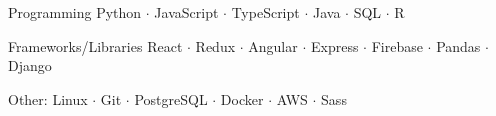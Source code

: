 

\begin{cvskills}

\cvskill
  {Programming} %
  {Python $\cdot$ JavaScript $\cdot$ TypeScript $\cdot$ Java $\cdot$ SQL $\cdot$ R } %

\cvskill
  {Frameworks/Libraries} %
  {React $\cdot$ Redux $\cdot$ Angular $\cdot$ Express $\cdot$ Firebase  $\cdot$ Pandas $\cdot$ Django } %

\cvskill
  {Other:} %
  {Linux $\cdot$ Git $\cdot$ PostgreSQL $\cdot$ Docker $\cdot$ AWS $\cdot$ Sass} %





\end{cvskills}
